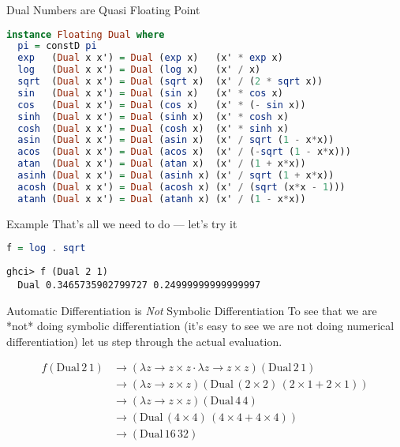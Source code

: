 \documentclass{beamer}
\begin{document}
\begin{frame}[fragile]{Dual Numbers are Quasi Floating Point}
\begin{scriptsize}
\begin{lstlisting}[language=Haskell]
instance Floating Dual where
  pi = constD pi
  exp   (Dual x x') = Dual (exp x)   (x' * exp x)
  log   (Dual x x') = Dual (log x)   (x' / x)
  sqrt  (Dual x x') = Dual (sqrt x)  (x' / (2 * sqrt x))
  sin   (Dual x x') = Dual (sin x)   (x' * cos x)
  cos   (Dual x x') = Dual (cos x)   (x' * (- sin x))
  sinh  (Dual x x') = Dual (sinh x)  (x' * cosh x)
  cosh  (Dual x x') = Dual (cosh x)  (x' * sinh x)
  asin  (Dual x x') = Dual (asin x)  (x' / sqrt (1 - x*x))
  acos  (Dual x x') = Dual (acos x)  (x' / (-sqrt (1 - x*x)))
  atan  (Dual x x') = Dual (atan x)  (x' / (1 + x*x))
  asinh (Dual x x') = Dual (asinh x) (x' / sqrt (1 + x*x))
  acosh (Dual x x') = Dual (acosh x) (x' / (sqrt (x*x - 1)))
  atanh (Dual x x') = Dual (atanh x) (x' / (1 - x*x))
\end{lstlisting}
\end{scriptsize}
\end{frame}


\begin{frame}[fragile]{Example}
That's all we need to do --- let's try it

\begin{scriptsize}
\begin{lstlisting}[language=Haskell]
f = log . sqrt
\end{lstlisting}
\end{scriptsize}

\begin{scriptsize}
\begin{lstlisting}
ghci> f (Dual 2 1)
  Dual 0.3465735902799727 0.24999999999999997
\end{lstlisting}
\end{scriptsize}
\end{frame}

\begin{frame}[fragile]{Automatic Differentiation is {\em Not} Symbolic
    Differentiation}
To see that we are *not* doing symbolic differentiation (it's easy to
see we are not doing numerical differentiation) let us step
through the actual evaluation.

$$
\begin{aligned}
f (\mathrm{Dual}\,2\,1) &\longrightarrow (\lambda z \rightarrow z
\times z \cdot \lambda z \rightarrow z \times z) (\mathrm{Dual}\,2\,1) \\
&\longrightarrow (\lambda z \rightarrow z
\times z) (\mathrm{Dual}\,(2 \times 2)\,(2 \times 1 + 2 \times 1)) \\
&\longrightarrow  (\lambda z \rightarrow z
\times z) (\mathrm{Dual}\,4\,4)\\
&\longrightarrow (\mathrm{Dual}\,(4 \times 4)\,(4 \times 4 + 4 \times 4)) \\
&\longrightarrow (\mathrm{Dual}\,16\,32)\\
\end{aligned}
$$
\end{frame}
\end{document}
